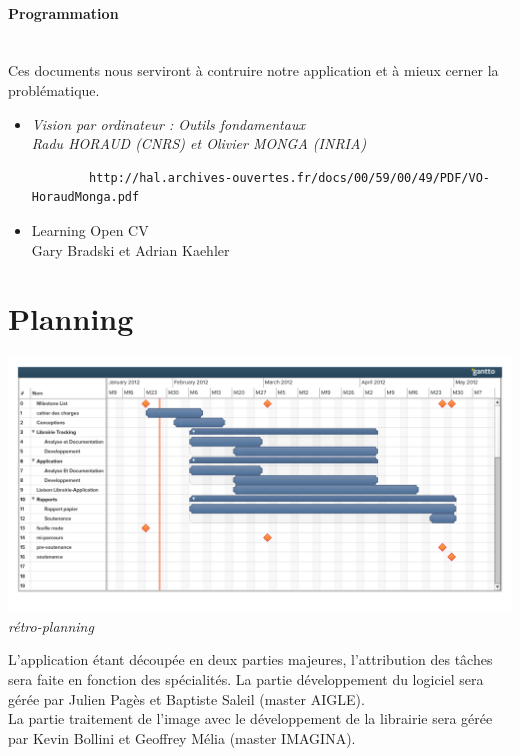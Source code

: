 \documentclass{article}
\begin{document}
	\paragraph{Programmation} \ \\
	Ces documents nous serviront à contruire notre application et à mieux cerner la problématique. \\	
	\begin{itemize}
		\item \it{Vision par ordinateur : Outils fondamentaux} \\
		Radu HORAUD (CNRS) et Olivier MONGA (INRIA)
		\begin{verbatim}
		http://hal.archives-ouvertes.fr/docs/00/59/00/49/PDF/VO-HoraudMonga.pdf
		\end{verbatim}
		\item Learning Open CV \\
		 Gary Bradski et Adrian Kaehler
	\end{itemize}

	\section{Planning}
	\begin{center}
		\includegraphics[scale=0.37]{retroplanning.pdf}
		\it rétro-planning
	\end{center}
	
	L'application étant découpée en deux parties majeures, l'attribution des tâches sera faite en fonction des spécialités.
	La partie développement du logiciel sera gérée par Julien Pagès et Baptiste Saleil (master AIGLE). \\
	La partie traitement de l'image avec le développement de la librairie sera gérée par Kevin Bollini et Geoffrey Mélia 
	(master IMAGINA).	
\end{document}
